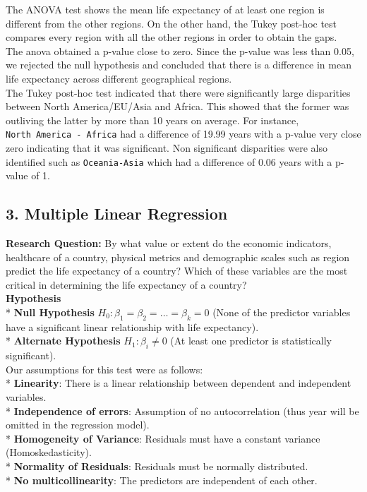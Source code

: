 \documentclass[
  10pt,
]{article}
\begin{document}
The ANOVA test shows the mean life expectancy of at least one region is
different from the other regions. On the other hand, the Tukey post-hoc
test compares every region with all the other regions in order to obtain
the gaps.\\

The anova obtained a p-value close to zero. Since the p-value was less
than 0.05, we rejected the null hypothesis and concluded that there is a
difference in mean life expectancy across different geographical
regions.\\
The Tukey post-hoc test indicated that there were significantly large
disparities between North America/EU/Asia and Africa. This showed that
the former was outliving the latter by more than 10 years on average.
For instance, \texttt{North\ America\ -\ Africa} had a difference of
19.99 years with a p-value very close zero indicating that it was
significant. Non significant disparities were also identified such as
\texttt{Oceania-Asia} which had a difference of 0.06 years with a
p-value of 1.\\

\subsection{3. Multiple Linear
Regression}\label{multiple-linear-regression}

\textbf{Research Question:} By what value or extent do the economic
indicators, healthcare of a country, physical metrics and demographic
scales such as region predict the life expectancy of a country? Which of
these variables are the most critical in determining the life expectancy
of a country?\\

\textbf{Hypothesis}\\
* \textbf{Null Hypothesis}
\(H_0: \beta_1 = \beta_2 = \dots = \beta_k = 0\) (None of the predictor
variables have a significant linear relationship with life
expectancy).\\
* \textbf{Alternate Hypothesis} \(H_1: \beta_i \neq 0\) (At least one
predictor is statistically significant).\\

Our assumptions for this test were as follows:\\
* \textbf{Linearity}: There is a linear relationship between dependent
and independent variables.\\
* \textbf{Independence of errors}: Assumption of no autocorrelation
(thus year will be omitted in the regression model).\\
* \textbf{Homogeneity of Variance}: Residuals must have a constant
variance (Homoskedasticity).\\
* \textbf{Normality of Residuals}: Residuals must be normally
distributed.\\
* \textbf{No multicollinearity}: The predictors are independent of each
other.\\
\end{document}
